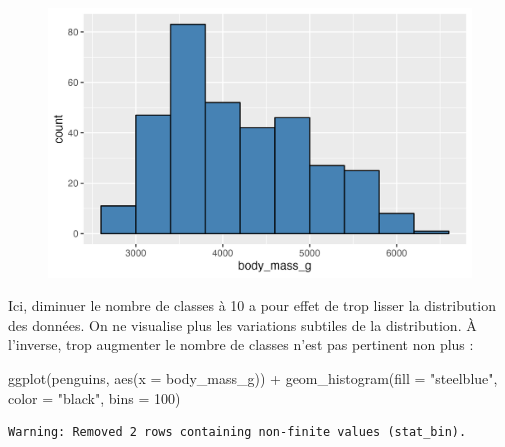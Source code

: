 \documentclass[
  letterpaper,
  DIV=11,
  numbers=noendperiod]{scrreprt}
\newenvironment{Shaded}{\begin{snugshade}}{\end{snugshade}}
\newcommand{\AttributeTok}[1]{\textcolor[rgb]{0.40,0.45,0.13}{#1}}
\newcommand{\DecValTok}[1]{\textcolor[rgb]{0.68,0.00,0.00}{#1}}
\newcommand{\FunctionTok}[1]{\textcolor[rgb]{0.28,0.35,0.67}{#1}}
\newcommand{\NormalTok}[1]{\textcolor[rgb]{0.00,0.23,0.31}{#1}}
\newcommand{\SpecialCharTok}[1]{\textcolor[rgb]{0.37,0.37,0.37}{#1}}
\newcommand{\StringTok}[1]{\textcolor[rgb]{0.13,0.47,0.30}{#1}}
\begin{document}
\begin{figure}[H]

{\centering \includegraphics{./03-visualization_files/figure-pdf/unnamed-chunk-13-1.png}

}

\end{figure}

Ici, diminuer le nombre de classes à 10 a pour effet de trop lisser la
distribution des données. On ne visualise plus les variations subtiles
de la distribution. À l'inverse, trop augmenter le nombre de classes
n'est pas pertinent non plus :

\begin{Shaded}
\begin{Highlighting}[]
\FunctionTok{ggplot}\NormalTok{(penguins, }\FunctionTok{aes}\NormalTok{(}\AttributeTok{x =}\NormalTok{ body\_mass\_g)) }\SpecialCharTok{+}
  \FunctionTok{geom\_histogram}\NormalTok{(}\AttributeTok{fill =} \StringTok{"steelblue"}\NormalTok{, }\AttributeTok{color =} \StringTok{"black"}\NormalTok{,}
                 \AttributeTok{bins =} \DecValTok{100}\NormalTok{)}
\end{Highlighting}
\end{Shaded}

\begin{verbatim}
Warning: Removed 2 rows containing non-finite values (stat_bin).
\end{verbatim}
\end{document}
